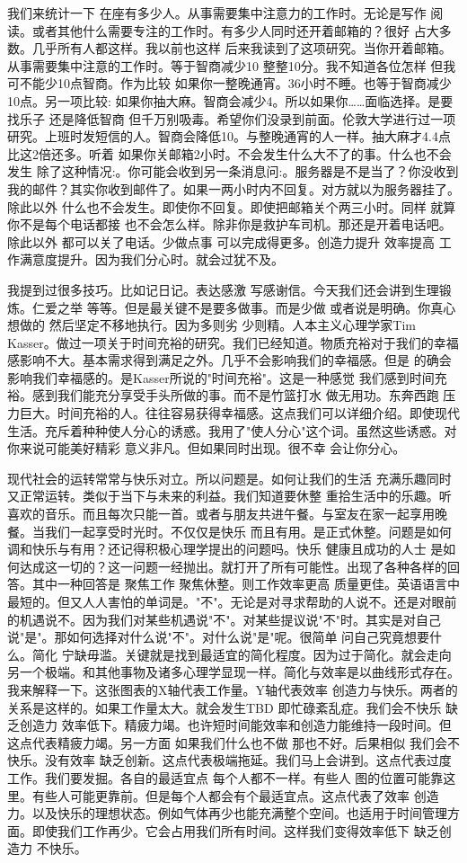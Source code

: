 我们来统计一下 在座有多少人。从事需要集中注意力的工作时。无论是写作 阅读。或者其他什么需要专注的工作时。有多少人同时还开着邮箱的？很好 占大多数。几乎所有人都这样。我以前也这样 后来我读到了这项研究。当你开着邮箱。从事需要集中注意的工作时。等于智商减少10 整整10分。我不知道各位怎样 但我可不能少10点智商。作为比较 如果你一整晚通宵。36小时不睡。也等于智商减少10点。另一项比较: 如果你抽大麻。智商会减少4。所以如果你……面临选择。是要找乐子 还是降低智商 但千万别吸毒。希望你们没录到前面。伦敦大学进行过一项研究。上班时发短信的人。智商会降低10。与整晚通宵的人一样。抽大麻才4.4点 比这2倍还多。听着 如果你关邮箱2小时。不会发生什么大不了的事。什么也不会发生 除了这种情况:。你可能会收到另一条消息问:。服务器是不是当了？你没收到我的邮件？其实你收到邮件了。如果一两小时内不回复。对方就以为服务器挂了。除此以外 什么也不会发生。即使你不回复。即使把邮箱关个两三小时。同样 就算你不是每个电话都接 也不会怎么样。除非你是救护车司机。那还是开着电话吧。除此以外 都可以关了电话。少做点事 可以完成得更多。创造力提升 效率提高 工作满意度提升。因为我们分心时。就会过犹不及。 

我提到过很多技巧。比如记日记。表达感激 写感谢信。今天我们还会讲到生理锻炼。仁爱之举 等等。但是最关键不是要多做事。而是少做 或者说是明确。你真心想做的 然后坚定不移地执行。因为多则劣 少则精。人本主义心理学家Tim Kasser。做过一项关于时间充裕的研究。我们已经知道。物质充裕对于我们的幸福感影响不大。基本需求得到满足之外。几乎不会影响我们的幸福感。但是 的确会影响我们幸福感的。是Kasser所说的"时间充裕"。这是一种感觉 我们感到时间充裕。感到我们能充分享受手头所做的事。而不是竹篮打水 做无用功。东奔西跑 压力巨大。时间充裕的人。往往容易获得幸福感。这点我们可以详细介绍。即使现代生活。充斥着种种使人分心的诱惑。我用了"使人分心"这个词。虽然这些诱惑。对你来说可能美好精彩 意义非凡。但如果同时出现。很不幸 会让你分心。 

现代社会的运转常常与快乐对立。所以问题是。如何让我们的生活 充满乐趣同时又正常运转。类似于当下与未来的利益。我们知道要休整 重拾生活中的乐趣。听喜欢的音乐。而且每次只能一首。或者与朋友共进午餐。与室友在家一起享用晚餐。当我们一起享受时光时。不仅仅是快乐 而且有用。是正式休整。问题是如何调和快乐与有用？还记得积极心理学提出的问题吗。快乐 健康且成功的人士 是如何达成这一切的？这一问题一经抛出。就打开了所有可能性。出现了各种各样的回答。其中一种回答是 聚焦工作 聚焦休整。则工作效率更高 质量更佳。英语语言中最短的。但又人人害怕的单词是。"不"。无论是对寻求帮助的人说不。还是对眼前的机遇说不。因为我们对某些机遇说"不"。对某些提议说"不"时。其实是对自己说"是"。那如何选择对什么说"不"。对什么说"是"呢。很简单 问自己究竟想要什么。简化 宁缺毋滥。关键就是找到最适宜的简化程度。因为过于简化。就会走向另一个极端。和其他事物及诸多心理学显现一样。简化与效率是以曲线形式存在。我来解释一下。这张图表的X轴代表工作量。Y轴代表效率 创造力与快乐。两者的关系是这样的。如果工作量太大。就会发生TBD 即忙碌紊乱症。我们会不快乐 缺乏创造力 效率低下。精疲力竭。也许短时间能效率和创造力能维持一段时间。但这点代表精疲力竭。另一方面 如果我们什么也不做 那也不好。后果相似 我们会不快乐。没有效率 缺乏创新。这点代表极端拖延。我们马上会讲到。这点代表过度工作。我们要发掘。各自的最适宜点 每个人都不一样。有些人 图的位置可能靠这里。有些人可能更靠前。但是每个人都会有个最适宜点。这点代表了效率 创造力。以及快乐的理想状态。例如气体再少也能充满整个空间。也适用于时间管理方面。即使我们工作再少。它会占用我们所有时间。这样我们变得效率低下 缺乏创造力 不快乐。 


